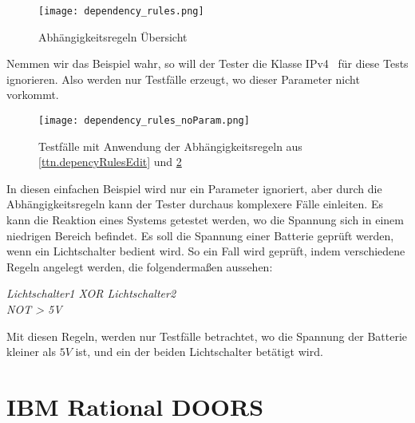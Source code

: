 \begin{figure}[h]
  \begin{center}
    \texttt{[image: dependency\_rules.png]}
  		  \caption{Abhängigkeitsregeln Übersicht}
     \label{ttn.depencyRules}
  \end{center}
\end{figure}

Nemmen wir das Beispiel wahr, so will der Tester die Klasse \glqq IPv4\grqq~ für diese Tests ignorieren. Also werden nur Testfälle erzeugt, wo dieser Parameter nicht vorkommt.


\begin{figure}[h]
  \begin{center}
    \texttt{[image: dependency\_rules\_noParam.png]}
  		  \caption{Testfälle mit Anwendung der Abhängigkeitsregeln aus \ref{ttn.depencyRulesEdit} und \ref{ttn.depencyRules}}
     \label{ttn.depencyRules}
  \end{center}
\end{figure}

In diesen einfachen Beispiel wird nur ein Parameter ignoriert, aber durch die Abhängigkeitsregeln kann der Tester durchaus komplexere Fälle einleiten. Es kann die Reaktion eines Systems getestet werden, wo die Spannung sich in einem niedrigen Bereich befindet. Es soll die Spannung einer Batterie geprüft werden, wenn ein Lichtschalter bedient wird. So ein Fall wird geprüft, indem verschiedene Regeln angelegt werden, die folgendermaßen aussehen:

\begin{center}
\textit{Lichtschalter1 XOR Lichtschalter2}\\
\textit{NOT > 5V}
\end{center}

Mit diesen Regeln, werden nur Testfälle betrachtet, wo die Spannung der Batterie kleiner als $5V$ ist, und ein der beiden Lichtschalter betätigt wird.





\newpage
\section{IBM Rational DOORS}\label{sec:DOORS}
\paragraph{}

